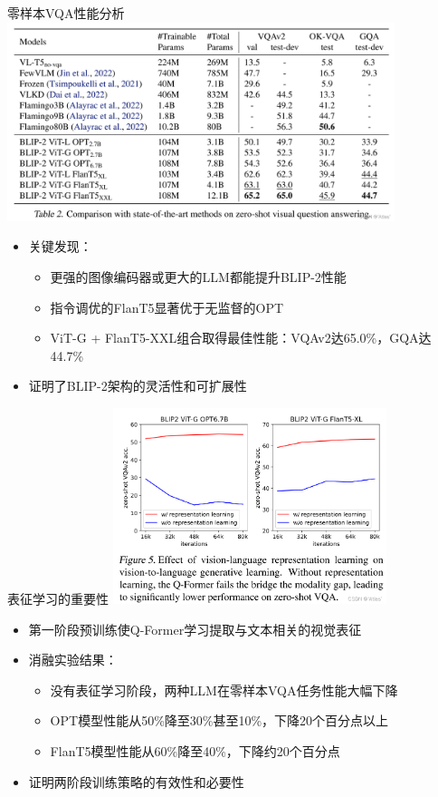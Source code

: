\documentclass{beamer}
\begin{document}
  \begin{frame}{零样本VQA性能分析}
    \centering
    \includegraphics[width=0.85\textwidth]{table3.png}
    \vspace{0.2cm}
    
    \begin{itemize}
      \item 关键发现：
        \begin{itemize}
          \item 更强的图像编码器或更大的LLM都能提升BLIP-2性能
          \item 指令调优的FlanT5显著优于无监督的OPT
          \item ViT-G + FlanT5-XXL组合取得最佳性能：VQAv2达65.0\%，GQA达44.7\%
        \end{itemize}
      \item 证明了BLIP-2架构的灵活性和可扩展性
    \end{itemize}
  \end{frame}
  
  \begin{frame}{表征学习的重要性}
    \centering
    \includegraphics[width=0.6\textwidth]{table4.png}
    \vspace{0.2cm}
    
    \begin{itemize}
      \item 第一阶段预训练使Q-Former学习提取与文本相关的视觉表征
      \item 消融实验结果：
        \begin{itemize}
          \item 没有表征学习阶段，两种LLM在零样本VQA任务性能大幅下降
          \item OPT模型性能从50\%降至30\%甚至10\%，下降20个百分点以上
          \item FlanT5模型性能从60\%降至40\%，下降约20个百分点
        \end{itemize}
      \item 证明两阶段训练策略的有效性和必要性
    \end{itemize}
  \end{frame}
  
\end{document}

